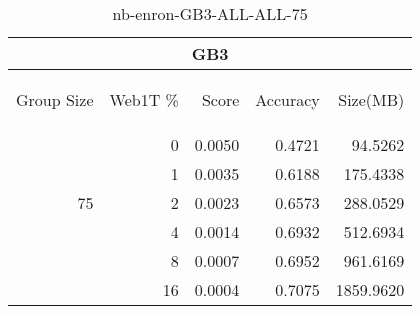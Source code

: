 \begin{center}
\begin{table}[htbp]
\begin{tabular}{ | r | r | r | r | r |}
\hline
\multicolumn{5}{|c|}{GB3}\\
\hline
\begin{sideways}Group Size\end{sideways} & \begin{sideways}Web1T \%\end{sideways} & \begin{sideways}Score\end{sideways} & \begin{sideways}Accuracy\end{sideways} & \begin{sideways}Size(MB)\end{sideways}\\
\hline
\multirow{5}{*}{75}
 & 0 & 0.0050 & 0.4721 & 94.5262\\ \cline{2-5}
 & 1 & 0.0035 & 0.6188 & 175.4338\\ \cline{2-5}
 & 2 & 0.0023 & 0.6573 & 288.0529\\ \cline{2-5}
 & 4 & 0.0014 & 0.6932 & 512.6934\\ \cline{2-5}
 & 8 & 0.0007 & 0.6952 & 961.6169\\ \cline{2-5}
 & 16 & 0.0004 & 0.7075 & 1859.9620\\ \cline{2-5}
\hline
\end{tabular}
\caption{nb-enron-GB3-ALL-ALL-75}
\label{table:nb-enron-GB3-ALL-ALL-75}
\end{table}
\end{center}

